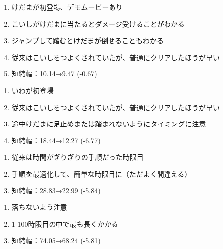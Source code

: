\begin{enumerate}[label={\sarrow}]
\item けだまが初登場、デモムービーあり
\item こいしがけだまに当たるとダメージ受けることがわかる
\item ジャンプして踏むとけだまが倒せることもわかる
\item 従来はこいしをつよくされていたが、普通にクリアしたほうが早い
\item 短縮幅：10.14→9.47 (-0.67)
\end{enumerate}



\clearpage
\begin{enumerate}[label={\sarrow}]
\item いわが初登場
\item 従来はこいしをつよくされていたが、普通にクリアしたほうが早い
\item 途中けだまに足止めまたは踏まれないようにタイミングに注意
\item 短縮幅：18.44→12.27 (-6.77)
\end{enumerate}



\begin{enumerate}[label={\sarrow}]
\item 従来は時間がぎりぎりの手順だった時限目
\item 手順を最適化して、簡単な時限目に（ただよく間違える）
\item 短縮幅：28.83→22.99 (-5.84)
\end{enumerate}



\begin{enumerate}[label={\sarrow}]
\item 落ちないよう注意
\item 1-100時限目の中で最も長くかかる
\item 短縮幅：74.05→68.24 (-5.81)
\end{enumerate}



